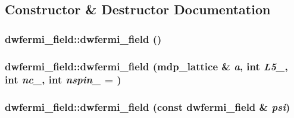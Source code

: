 \subsection{Constructor \& Destructor Documentation}
\hypertarget{classdwfermi__field_a3463b5fdc91d928f765eb4ee35601672}{
\subsubsection[{dwfermi\_\-field}]{\setlength{\rightskip}{0pt plus 5cm}dwfermi\_\-field::dwfermi\_\-field ()}}
\label{classdwfermi__field_a3463b5fdc91d928f765eb4ee35601672}
\hypertarget{classdwfermi__field_aea31f2beacd9fbf84b10488566a63982}{
\subsubsection[{dwfermi\_\-field}]{\setlength{\rightskip}{0pt plus 5cm}dwfermi\_\-field::dwfermi\_\-field ({\bf mdp\_\-lattice} \& {\em a}, \/  int {\em L5\_\-}, \/  int {\em nc\_\-}, \/  int {\em nspin\_\-} = {})}}
\label{classdwfermi__field_aea31f2beacd9fbf84b10488566a63982}
\hypertarget{classdwfermi__field_ae761300ce0a04ef58386ca3e58c7311c}{
\subsubsection[{dwfermi\_\-field}]{\setlength{\rightskip}{0pt plus 5cm}dwfermi\_\-field::dwfermi\_\-field (const {\bf dwfermi\_\-field} \& {\em psi})}}
\label{classdwfermi__field_ae761300ce0a04ef58386ca3e58c7311c}


